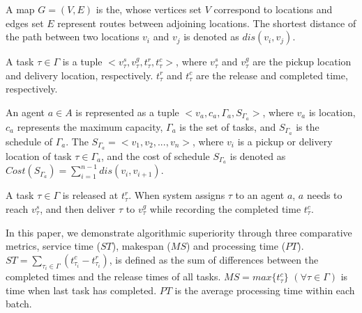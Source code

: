 \documentclass[sigconf,anonymous]{aamas}
\begin{document}
\begin{definition}[Map]
\label{MapDfn}
    A map $G = (V, E)$ is the, 
    whose vertices set $V$ correspond to locations and edges set $E$ represent routes between adjoining locations.
    The shortest distance of the path between two locations $v_{i}$ and $v_{j}$ is denoted as $dis(v_{i}, v_{j})$.

\end{definition}

\begin{definition}[Task]
\label{TaskDfn}
    A task $\tau \in \Gamma$ is a tuple 
    $<v^{s}_{\tau}, v^{g}_{\tau}, t^{r}_{\tau}, t^{c}_{\tau}>$, 
    where $v^{s}_{\tau}$ and $v^{g}_{\tau}$ are the pickup location and delivery location, respectively. 
    $t^{r}_{\tau}$ and $t^{c}_{\tau}$ are the release and completed time, respectively.
\end{definition}


\begin{definition}[Agent]
\label{AgentDfn}
    An agent $a \in A$ is represented as a tuple $<v_{a}, c_{a}, \Gamma_{a}, S_{\Gamma_{a}}>$, 
    where $v_{a}$ is location, $c_{a}$ represents the maximum capacity, 
    $\Gamma_{a}$ is the set of tasks, and $S_{\Gamma_{a}}$ is the schedule of $\Gamma_{a}$. 
    The $S_{\Gamma_{a}} = <v_{1}, v_{2},..., v_{n}>$, 
    where $v_{i}$ is a pickup or delivery location of task $\tau \in \Gamma_{a}$,
    and the cost of schedule $S_{\Gamma_{a}}$ is denoted as 
    $Cost(S_{\Gamma_{a}}) = \sum^{n-1}_{i=1}{dis(v_i, v_{i+1})}$.
\end{definition}

A task $\tau \in \Gamma$ is released at $t^{r}_{\tau}$. 
When system assigns $\tau$ to an agent $a$, 
$a$ needs to reach $v^{s}_{\tau}$, 
and then deliver $\tau$ to $v^g_{\tau}$ while recording the completed time $t^{c}_{\tau}$. 


\begin{definition}
    In this paper, we demonstrate algorithmic superiority through three comparative metrics, 
    service time (${ST}$), makespan ($MS$) and processing time ($PT$). 
    $ST = \sum_{\tau_i \in \Gamma}{(t^{c}_{\tau_i} - t^{r}_{\tau_i})}$, 
    is defined as the sum of differences between the completed times and the release times of all tasks.
    $MS = max{\{t^{c}_{\tau}\}}$ $(\forall \tau \in \Gamma)$ 
    is time when last task has completed.
    $PT$ is the average processing time within each batch.
       
\end{definition}
\end{document}
